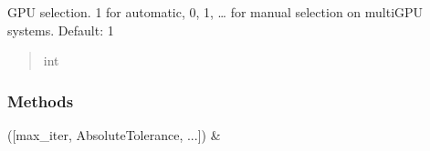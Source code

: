 \documentclass[letterpaper,10pt,english]{sphinxmanual}
\begin{document}
\begin{fulllineitems}
\begin{fulllineitems}
\begin{quote}
\begin{description}
\end{description}\end{quote}

\end{fulllineitems}


\begin{fulllineitems}
\label{\detokenize{_autosummary/nirfasterff.utils.SolverOptions:nirfasterff.utils.SolverOptions.GPU}}
\pysigstartsignatures
{}
\pysigstopsignatures
\sphinxAtStartPar
GPU selection. \sphinxhyphen{}1 for automatic, 0, 1, … for manual selection on multi\sphinxhyphen{}GPU systems. Default: \sphinxhyphen{}1
\begin{quote}\begin{description}
\sphinxAtStartPar
int

\end{description}\end{quote}

\end{fulllineitems}


\begin{fulllineitems}
\label{\detokenize{_autosummary/nirfasterff.utils.SolverOptions:nirfasterff.utils.SolverOptions.__init__}}
\pysigstartsignatures
{}
\pysigstopsignatures
\end{fulllineitems}

\subsubsection*{Methods}


\begin{savenotes}\sphinxattablestart
\sphinxthistablewithglobalstyle
\sphinxthistablewithnovlinesstyle
\centering
\begin{tabulary}{\linewidth}[t]{}
\sphinxtoprule
\sphinxtableatstartofbodyhook
\sphinxAtStartPar
{\hyperref[\detokenize{_autosummary/nirfasterff.utils.SolverOptions:nirfasterff.utils.SolverOptions.__init__}]{}}({[}max\_iter, AbsoluteTolerance, ...{]})
&
\sphinxAtStartPar


\end{tabulary}
\end{savenotes}
\end{fulllineitems}
\end{document}
